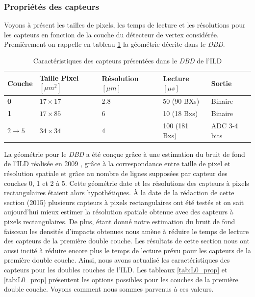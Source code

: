   \subsubsection{Propri\'et\'es des capteurs}
  
  Voyons \`a pr\'esent les tailles de pixels, les temps de lecture et les r\'esolutions pour les capteurs en fonction de la couche du d\'etecteur de vertex consid\'er\'ee. Premi\`erement on rappelle en tableau \ref{tab:DBD_properties} la g\'eom\'etrie d\'ecrite dans le \textit{DBD}.
  
  \medskip
  
  \begin{table}[h]
  \small
  \centering
  \begin{tabular}{|l|l|l|l|l|}
  \hline
  \textbf{Couche}            & \textbf{Taille Pixel $[\mu m^2]$} & \textbf{R\'esolution $[\mu m]$} & \textbf{Lecture $[\mu s]$} & \textbf{Sortie} \\ \hline
  \textbf{0}                 & $17 \times 17$                    & 2.8                           & 50 (90 BXs)                    & Binaire         \\ \hline
  \textbf{1}                 & $17 \times 85$                    & 6                             & 10 (18 Bxs)                   & Binaire         \\ \hline
  $2 \rightarrow 5$ & $34 \times 34$                    & 4                             & 100 (181 Bxs)                 & ADC 3-4 bits    \\ \hline
  \end{tabular}
  \caption{Caract\'eristiques des capteurs pr\'esent\'ees dans le \textit{DBD} de l'ILD}
  \label{tab:DBD_properties}
  \end{table}

  La g\'eom\'etrie pour le \textit{DBD} a \'et\'e con\c{c}ue gr\^ace \`a une estimation du bruit de fond de l'ILD r\'ealis\'ee en 2009 \cite{DeMasi:2009ym}, gr\^ace \`a la correspondance entre taille de pixel et r\'esolution spatiale et grâce au nombre de lignes suppos\'ees par capteur des couches 0, 1 et 2 \`a 5. Cette g\'eom\'etrie date et les r\'esolutions des capteurs \`a pixels rectangulaires \'etaient alors hypoth\'etiques. \`A la date de la r\'edaction de cette section (2015) plusieurs capteurs \`a pixels rectangulaires ont \'et\'e test\'es et on sait aujourd'hui mieux estimer la r\'esolution spatiale obtenue avec des capteurs \`a pixels rectangulaires. De plus, \'etant donn\'e notre estimation du bruit de fond faisceau les densit\'es d'impacts obtenues nous am\`ene \`a réduire le temps de lecture des capteurs de la premi\`ere double couche. Les r\'esultats de cette section nous ont aussi incit\'e \`a r\'eduire encore plus le temps de lecture pr\'evu pour les capteurs de la premi\`ere double couche. Ainsi, nous avons actualis\'e les caract\'eristiques des capteurs pour les doubles couches de l'ILD. Les tableaux \ref{tab:L0_prop} et \ref{tab:L0_prop} pr\'esentent les options possibles pour les couches de la premi\`ere double couche. Voyons comment nous sommes parvenus \`a ces valeurs.
  
